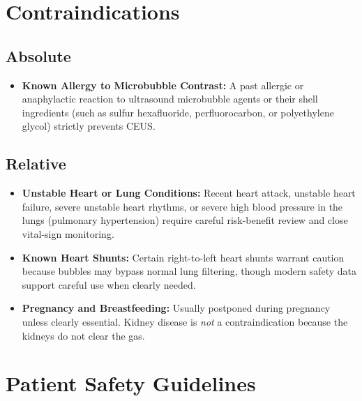 \section{Contraindications}

\subsection{Absolute}

\begin{itemize}
    \item \textbf{Known Allergy to Microbubble Contrast:} A past allergic or anaphylactic reaction to ultrasound microbubble agents or their shell ingredients (such as sulfur hexafluoride, perfluorocarbon, or polyethylene glycol) strictly prevents CEUS.
\end{itemize}

\subsection{Relative}

\begin{itemize}
    \item \textbf{Unstable Heart or Lung Conditions:} Recent heart attack, unstable heart failure, severe unstable heart rhythms, or severe high blood pressure in the lungs (pulmonary hypertension) require careful risk-benefit review and close vital-sign monitoring.
    \item \textbf{Known Heart Shunts:} Certain right-to-left heart shunts warrant caution because bubbles may bypass normal lung filtering, though modern safety data support careful use when clearly needed.
    \item \textbf{Pregnancy and Breastfeeding:} Usually postponed during pregnancy unless clearly essential. Kidney disease is \emph{not} a contraindication because the kidneys do not clear the gas.
\end{itemize}

\section{Patient Safety Guidelines}


